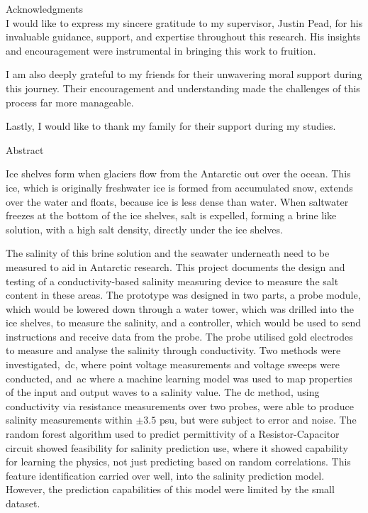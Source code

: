 \documentclass[a4paper,12pt]{report}
\begin{document}
{{%


\newpage
{\Huge Acknowledgments}\\
\vskip 10mm
I would like to express my sincere gratitude to my supervisor, Justin Pead, for his invaluable guidance, support, and expertise throughout this research.
His insights and encouragement were instrumental in bringing this work to fruition.

I am also deeply grateful to my friends for their unwavering moral support during this journey.
Their encouragement and understanding made the challenges of this process far more manageable.

Lastly, I would like to thank my family for their support during my studies.

\newpage
    {\Huge Abstract}\\
    \vskip 10mm

    Ice shelves form when glaciers flow from the Antarctic out over the ocean.
    This ice, which is originally freshwater ice is formed from accumulated snow, extends over the water and floats, because ice is less dense than water.
    When saltwater freezes at the bottom of the ice shelves, salt is expelled, forming a brine like solution, with a high salt density, directly under the ice shelves.

    The salinity of this brine solution and the seawater underneath need to be measured to aid in Antarctic research.
    This project documents the design and testing of a conductivity-based salinity measuring device to measure the salt content in these areas.
    The prototype was designed in two parts, a probe module, which would be lowered down through a water tower, which was drilled into the ice shelves, to measure the salinity, and a controller, which would be used to send instructions and receive data from the probe.
    The probe utilised gold electrodes to measure and analyse the salinity through conductivity.
    Two methods were investigated,~\gls{dc}, where point voltage measurements and voltage sweeps were conducted, and~\gls{ac} where a machine learning model was used to map properties of the input and output waves to a salinity value.
    The \gls{dc} method, using conductivity via resistance measurements over two probes, were able to produce salinity measurements within $\pm3.5$ \gls{psu}, but were subject to error and noise.
    The random forest algorithm used to predict permittivity of a Resistor-Capacitor circuit showed feasibility for salinity prediction use, where it showed capability for learning the physics, not just predicting based on random correlations.
    This feature identification carried over well, into the salinity prediction model. However, the prediction capabilities of this model were limited by the small dataset.

}}
\end{document}
